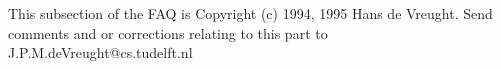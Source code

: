 
This subsection of the FAQ is Copyright (c) 1994, 1995 Hans de Vreught.
Send comments and or corrections relating to this part to
J.P.M.deVreught@cs.tudelft.nl


